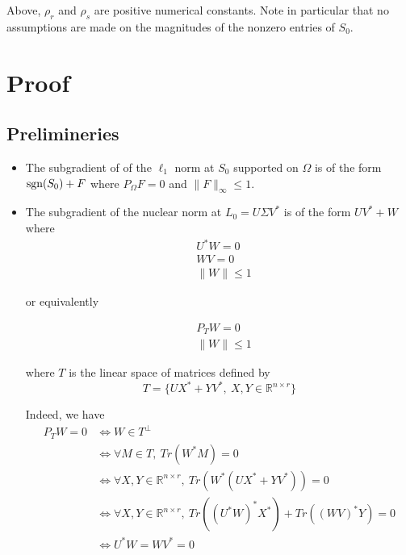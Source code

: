 \documentclass{../common/projectreport}
\begin{document}
Above, $\rho_r$ and $\rho_s$ are positive numerical constants. Note in particular that no assumptions are made on the magnitudes of the nonzero entries of $S_0$.


\section{Proof}
\subsection{Prelimineries}
\begin{itemize}
\item The subgradient of of the $\ell_1$ norm at $S_0$ supported on $\Omega$ is of the form $\text{sgn}(S_0)+F$ where $P_\Omega F = 0$ and $\|F\|_\infty \leq 1$.
\item The subgradient of the nuclear norm at $L_0 = U\Sigma V^*$ is of the form $U V^* + W$ where 
\begin{equation}
\begin{aligned}
&U^*W = 0 \\
& WV = 0\\
& \|W\| \leq 1
\end{aligned}
\end{equation}

or equivalently

\begin{equation}
\begin{aligned}
& P_T W = 0 \\
& \|W\| \leq 1
\end{aligned}
\end{equation}

where $T$ is the linear space of matrices defined by
\[
T = \{UX^* + YV^*, \  X, Y \in \mathbb{R}^{n \times r}\}
\]

Indeed, we have
\begin{align*}
P_TW = 0
&\Leftrightarrow W \in T^\perp  \\
&\Leftrightarrow \forall M \in T, \ Tr(W^*M) = 0\\
&\Leftrightarrow \forall X, Y \in \mathbb{R}^{n \times r}, \ Tr(W^*(UX^* + YV^*)) = 0\\
&\Leftrightarrow \forall X, Y \in \mathbb{R}^{n \times r}, \ Tr((U^*W)^*X^*) + Tr((WV)^*Y) = 0\\
&\Leftrightarrow U^*W = WV^* = 0
\end{align*}


\end{itemize}
\end{document}
